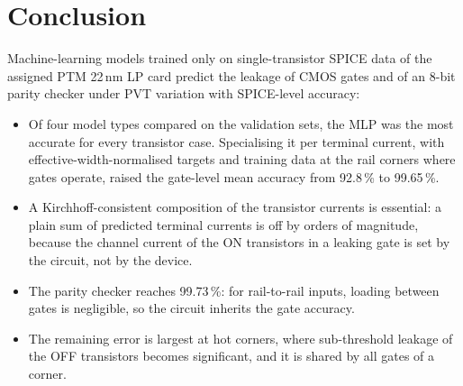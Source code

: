 \section{Conclusion}\label{sec:conclusion}
Machine-learning models trained only on single-transistor SPICE data of the assigned PTM 22\,nm LP card predict the leakage of CMOS gates and of an
8-bit parity checker under PVT variation with SPICE-level accuracy:

\begin{itemize}
  \item Of four model types compared on the validation sets, the MLP was the most accurate for every transistor case. Specialising it per terminal
        current, with effective-width-normalised targets and training data at the rail corners where gates operate, raised the gate-level mean accuracy
        from 92.8\,\% to 99.65\,\%.
  \item A Kirchhoff-consistent composition of the transistor currents is essential: a plain sum of predicted terminal currents is off by orders of
        magnitude, because the channel current of the ON transistors in a leaking gate is set by the circuit, not by the device.
  \item The parity checker reaches 99.73\,\%: for rail-to-rail inputs, loading between gates is negligible, so the circuit inherits the gate accuracy.
  \item The remaining error is largest at hot corners, where sub-threshold leakage of the OFF transistors becomes significant, and it is shared by all
        gates of a corner.
\end{itemize}
